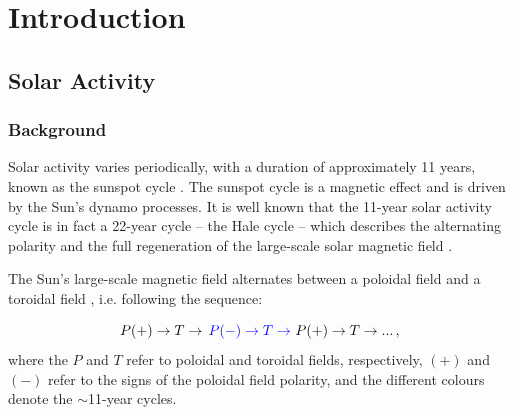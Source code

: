 \chapter{Introduction}\label{chap:intro}



\glsresetall 
{}
\section{Solar Activity}\label{sec:intro_activity}

\subsection{Background}

Solar activity varies periodically, with a duration of approximately 11 years, known as the sunspot cycle \citep{hathaway_solar_2015}. The sunspot cycle is a magnetic effect and is driven by the Sun's dynamo processes. It is well known that the 11-year solar activity cycle is in fact a 22-year cycle -- the Hale cycle -- which describes the alternating polarity and the full regeneration of the large-scale solar magnetic field \citep{hathaway_solar_2015, charbonneau_dynamo_2020}. 


The Sun's large-scale magnetic field alternates between a poloidal field and a toroidal field \citep{charbonneau_dynamo_2020}, i.e. following the sequence:

\begin{equation}
P(+) \rightarrow T \rightarrow \, \textcolor{blue}{P(-) \rightarrow T \rightarrow \,} \, P(+) \rightarrow T \rightarrow ... \, ,
\label{eq:solar_cycle_dynamo}
\end{equation}
%
where the $P$ and $T$ refer to poloidal and toroidal fields, respectively, $(+)$ and $(-)$ refer to the signs of the poloidal field polarity, and the different colours denote the $\sim$11-year cycles.

